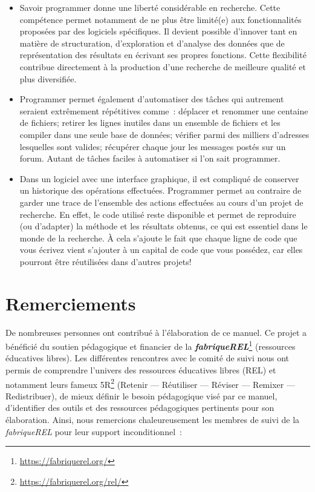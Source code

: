 \documentclass[
  11pt,
  french,
]{book}
\renewcommand{\href}[2]{#2\footnote{\url{#1}}}
\begin{document}
\begin{itemize}
\item
  Savoir programmer donne une liberté considérable en recherche. Cette compétence permet notamment de ne plus être limité(e) aux fonctionnalités proposées par des logiciels spécifiques. Il devient possible d'innover tant en matière de structuration, d'exploration et d'analyse des données que de représentation des résultats en écrivant ses propres fonctions. Cette flexibilité contribue directement à la production d'une recherche de meilleure qualité et plus diversifiée.
\item
  Programmer permet également d'automatiser des tâches qui autrement seraient extrêmement répétitives comme~: déplacer et renommer une centaine de fichiers; retirer les lignes inutiles dans un ensemble de fichiers et les compiler dans une seule base de données; vérifier parmi des milliers d'adresses lesquelles sont valides; récupérer chaque jour les messages postés sur un forum. Autant de tâches faciles à automatiser si l'on sait programmer.
\item
  Dans un logiciel avec une interface graphique, il est compliqué de conserver un historique des opérations effectuées. Programmer permet au contraire de garder une trace de l'ensemble des actions effectuées au cours d'un projet de recherche. En effet, le code utilisé reste disponible et permet de reproduire (ou d'adapter) la méthode et les résultats obtenus, ce qui est essentiel dans le monde de la recherche. À cela s'ajoute le fait que chaque ligne de code que vous écrivez vient s'ajouter à un capital de code que vous possédez, car elles pourront être réutilisées dans d'autres projets!
\end{itemize}

\hypertarget{sect006}{%
\section*{Remerciements}\label{sect006}}

De nombreuses personnes ont contribué à l'élaboration de ce manuel. Ce projet a bénéficié du soutien pédagogique et financier de la \href{https://fabriquerel.org/}{\textbf{\emph{fabriqueREL}}} (ressources éducatives libres). Les différentes rencontres avec le comité de suivi nous ont permis de comprendre l'univers des ressources éducatives libres (REL) et notamment leurs \href{https://fabriquerel.org/rel/}{fameux 5R} (Retenir --- Réutiliser --- Réviser --- Remixer --- Redistribuer), de mieux définir le besoin pédagogique visé par ce manuel, d'identifier des outils et des ressources pédagogiques pertinents pour son élaboration. Ainsi, nous remercions chaleureusement les membres de suivi de la \emph{fabriqueREL} pour leur support inconditionnel~:
\end{document}
